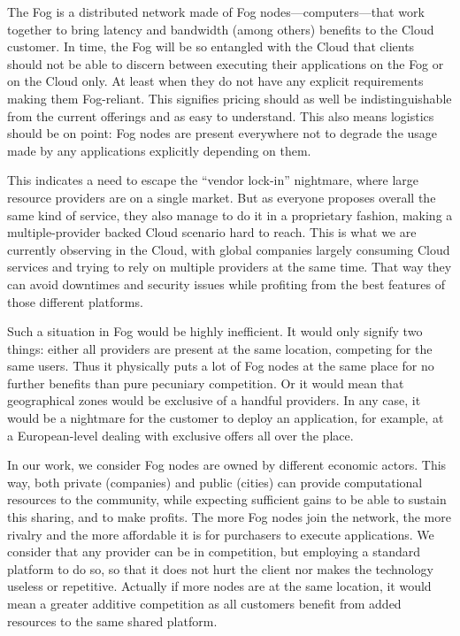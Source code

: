 The Fog is a distributed network made of Fog nodes—computers—that work together to bring latency and bandwidth (among others) benefits to the Cloud customer. In time, the Fog will be so entangled with the Cloud that clients should not be able to discern between executing their applications on the Fog or on the Cloud only. At least when they do not have any explicit requirements making them Fog-reliant. This signifies pricing should as well be indistinguishable from the current offerings and as easy to understand. This also means logistics should be on point: Fog nodes are present everywhere not to degrade the usage made by any applications explicitly depending on them.

This indicates a need to escape the “vendor lock-in” nightmare, where large resource providers are on a single market. But as everyone proposes overall the same kind of service, they also manage to do it in a proprietary fashion, making a multiple-provider backed Cloud scenario hard to reach. This is what we are currently observing in the Cloud, with global companies largely consuming Cloud services and trying to rely on multiple providers at the same time. That way they can avoid downtimes and security issues while profiting from the best features of those different platforms.

Such a situation in Fog would be highly inefficient. It would only signify two things: either all providers are present at the same location, competing for the same users. Thus it physically puts a lot of Fog nodes at the same place for no further benefits than pure pecuniary competition. Or it would mean that geographical zones would be exclusive of a handful providers. In any case, it would be a nightmare for the customer to deploy an application, for example, at a European-level dealing with exclusive offers all over the place.

In our work, we consider Fog nodes are owned by different economic actors. This way, both private (companies) and public (cities) can provide computational resources to the community, while expecting sufficient gains to be able to sustain this sharing, and to make profits. The more Fog nodes join the network, the more rivalry and the more affordable it is for purchasers to execute applications. We consider that any provider can be in competition, but employing a standard platform to do so, so that it does not hurt the client nor makes the technology useless or repetitive. Actually if more nodes are at the same location, it would mean a greater additive competition as all customers benefit from added resources to the same shared platform.

